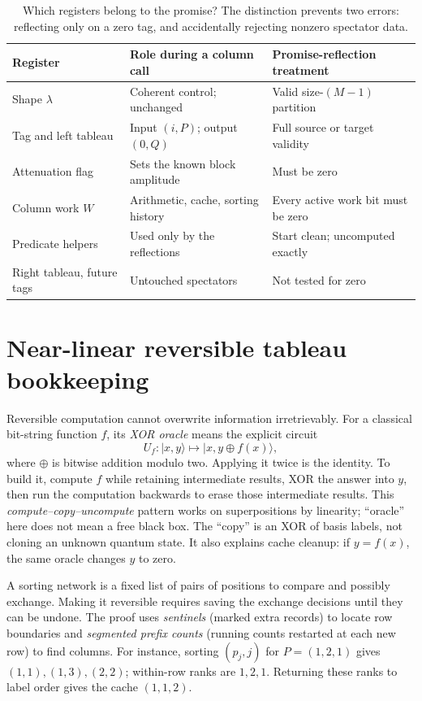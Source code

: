 \documentclass[11pt]{article}
\theoremstyle{definition}
\newcommand{\ket}[1]{\lvert #1\rangle}
\begin{document}
\begin{table}[htbp]
\centering\small
\begin{tabularx}{\textwidth}{@{}lXX@{}}
\toprule
Register & Role during a column call & Promise-reflection treatment\\
\midrule
Shape $\lambda$ & Coherent control; unchanged & Valid size-$(M-1)$ partition\\
Tag and left tableau & Input $(i,P)$; output $(0,Q)$ & Full source or target validity\\
Attenuation flag & Sets the known block amplitude & Must be zero\\
Column work $W$ & Arithmetic, cache, sorting history & Every active work bit must be zero\\
Predicate helpers & Used only by the reflections & Start clean; uncomputed exactly\\
Right tableau, future tags & Untouched spectators & Not tested for zero\\
\bottomrule
\end{tabularx}
\caption{Which registers belong to the promise? The distinction prevents
two errors: reflecting only on a zero tag, and accidentally rejecting
nonzero spectator data.}\label{tab:registers}
\end{table}

\section{Near-linear reversible tableau bookkeeping}\label{sec:bookkeeping}

Reversible computation cannot overwrite information irretrievably.
For a classical bit-string function $f$, its \emph{XOR oracle} means the
explicit circuit
\[
 U_f:\ket{x,y}\longmapsto\ket{x,y\mathbin{\oplus}f(x)},
\]
where $\oplus$ is bitwise addition modulo two. Applying it twice is the
identity. To build it, compute $f$ while retaining intermediate results,
XOR the answer into $y$, then run the computation backwards to erase
those intermediate results. This \emph{compute--copy--uncompute}
pattern works on superpositions by linearity; ``oracle'' here does not
mean a free black box. The ``copy'' is an XOR of basis labels, not
cloning an unknown quantum state. It also explains cache cleanup: if
$y=f(x)$, the same oracle changes $y$ to zero.

A sorting network is a fixed list of pairs of positions to compare and
possibly exchange. Making it reversible requires saving the exchange
decisions until they can be undone. The proof uses \emph{sentinels}
(marked extra records) to locate row boundaries and \emph{segmented
prefix counts} (running counts restarted at each new row) to find columns.
For instance, sorting $(p_j,j)$ for $P=(1,2,1)$ gives
$(1,1),(1,3),(2,2)$; within-row ranks are $1,2,1$. Returning these ranks
to label order gives the cache $(1,1,2)$.
\end{document}
